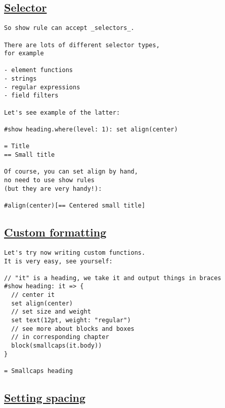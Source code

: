 \subsection{\texorpdfstring{\hyperref[selector]{Selector}}{Selector}}\label{selector}

\begin{verbatim}
So show rule can accept _selectors_.

There are lots of different selector types,
for example

- element functions
- strings
- regular expressions
- field filters

Let's see example of the latter:

#show heading.where(level: 1): set align(center)

= Title
== Small title

Of course, you can set align by hand,
no need to use show rules
(but they are very handy!):

#align(center)[== Centered small title]
\end{verbatim}

\pandocbounded{}

\subsection{\texorpdfstring{\hyperref[custom-formatting]{Custom
formatting}}{Custom formatting}}\label{custom-formatting}

\begin{verbatim}
Let's try now writing custom functions.
It is very easy, see yourself:

// "it" is a heading, we take it and output things in braces
#show heading: it => {
  // center it
  set align(center)
  // set size and weight
  set text(12pt, weight: "regular")
  // see more about blocks and boxes
  // in corresponding chapter
  block(smallcaps(it.body))
}

= Smallcaps heading
\end{verbatim}

\pandocbounded{}

\subsection{\texorpdfstring{\hyperref[setting-spacing]{Setting
spacing}}{Setting spacing}}\label{setting-spacing}

